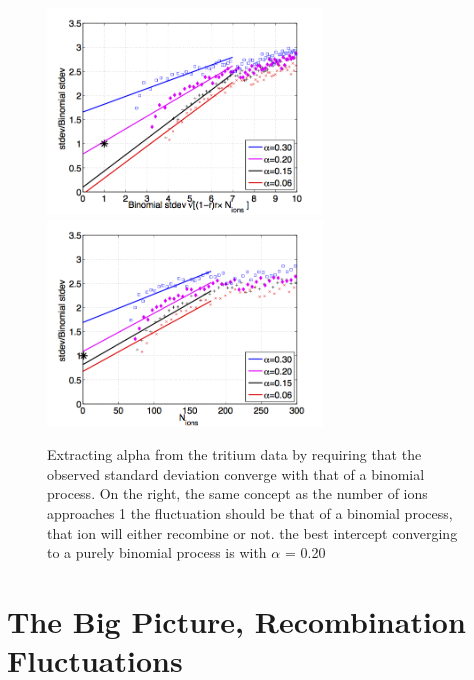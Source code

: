 \begin{figure}[h!]\centering
\includegraphics[width=73mm]{Chapter_Flucs/Figures/alpha/bino_norm_amp_iter1Tritium_LY_QY_100_iter1.png}
\includegraphics[width=73mm]{Chapter_Flucs/Figures/alpha/bino_norm_amp_ions_iter1Tritium_LY_QY_100_iter1.png}
\caption{Extracting alpha from the tritium data by requiring that the observed standard deviation converge with that of a binomial process. On the right, the same concept as the number of ions approaches 1 the fluctuation should be that of a binomial process, that ion will either recombine or not.  the best intercept converging to a purely binomial process is with $\alpha$ = 0.20 }
\label{fig:Alpha_T}
\end{figure}


\section{The Big Picture, Recombination Fluctuations}


